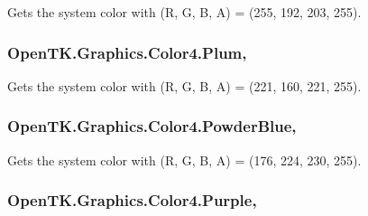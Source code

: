 Gets the system color with (R, G, B, A) = (255, 192, 203, 255). 

\hypertarget{struct_open_t_k_1_1_graphics_1_1_color4_a13aef494832fbf06bf62d6284bfe9915}{
\subsubsection[{Plum}]{ Open\-T\-K.\-Graphics.\-Color4.\-Plum\hspace{0.3cm}{\ttfamily [static]}, {\ttfamily [get]}}}\label{struct_open_t_k_1_1_graphics_1_1_color4_a13aef494832fbf06bf62d6284bfe9915}


Gets the system color with (R, G, B, A) = (221, 160, 221, 255). 

\hypertarget{struct_open_t_k_1_1_graphics_1_1_color4_a99b287016313e04c70b23061f671a635}{
\subsubsection[{Powder\-Blue}]{ Open\-T\-K.\-Graphics.\-Color4.\-Powder\-Blue\hspace{0.3cm}{\ttfamily [static]}, {\ttfamily [get]}}}\label{struct_open_t_k_1_1_graphics_1_1_color4_a99b287016313e04c70b23061f671a635}


Gets the system color with (R, G, B, A) = (176, 224, 230, 255). 

\hypertarget{struct_open_t_k_1_1_graphics_1_1_color4_a155922c0ef7636809a293277b0ea76cf}{
\subsubsection[{Purple}]{ Open\-T\-K.\-Graphics.\-Color4.\-Purple\hspace{0.3cm}{\ttfamily [static]}, {\ttfamily [get]}}}\label{struct_open_t_k_1_1_graphics_1_1_color4_a155922c0ef7636809a293277b0ea76cf}


